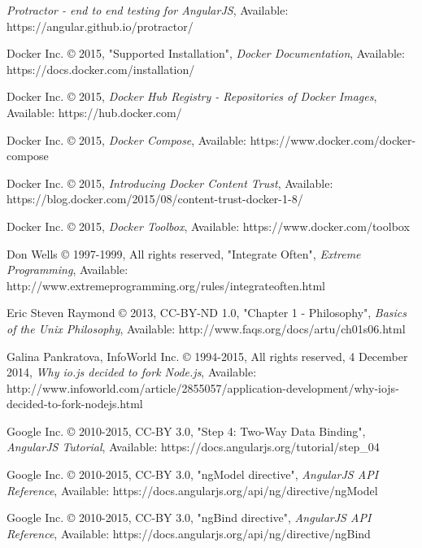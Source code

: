 \begin{thebibliography}{999}

\raggedright
{\em Protractor - end to end testing for AngularJS},
Available: https://angular.github.io/protractor/

Docker Inc. © 2015, "Supported Installation",
{\em Docker Documentation},
Available: https://docs.docker.com/installation/

Docker Inc. © 2015,
{\em Docker Hub Registry - Repositories of Docker Images},
Available: https://hub.docker.com/

\raggedright
Docker Inc. © 2015,
{\em Docker Compose},
Available: https://www.docker.com/docker-compose

\raggedright
Docker Inc. © 2015,
{\em Introducing Docker Content Trust},
Available: https://blog.docker.com/2015/08/content-trust-docker-1-8/

\raggedright
Docker Inc. © 2015,
{\em Docker Toolbox},
Available: https://www.docker.com/toolbox

\raggedright
Don Wells © 1997-1999, All rights reserved, "Integrate Often",
{\em Extreme Programming},
Available: http://www.extremeprogramming.org/rules/integrateoften.html

\raggedright
Eric Steven Raymond © 2013, CC-BY-ND 1.0, "Chapter 1 - Philosophy",
{\em Basics of the Unix Philosophy},
Available: http://www.faqs.org/docs/artu/ch01s06.html

\raggedright
Galina Pankratova, InfoWorld Inc. © 1994-2015, All rights reserved, 4 December 2014,
{\em Why io.js decided to fork Node.js},
Available: http://www.infoworld.com/article/2855057/application-development/why-iojs-decided-to-fork-nodejs.html

\raggedright
Google Inc. © 2010-2015, CC-BY 3.0, "Step 4: Two-Way Data Binding",
{\em AngularJS Tutorial},
Available: https://docs.angularjs.org/tutorial/step\_04

\raggedright
Google Inc. © 2010-2015, CC-BY 3.0, "ngModel directive",
{\em AngularJS API Reference},
Available: https://docs.angularjs.org/api/ng/directive/ngModel

\raggedright
Google Inc. © 2010-2015, CC-BY 3.0, "ngBind directive",
{\em AngularJS API Reference},
Available: https://docs.angularjs.org/api/ng/directive/ngBind


\end{thebibliography}
